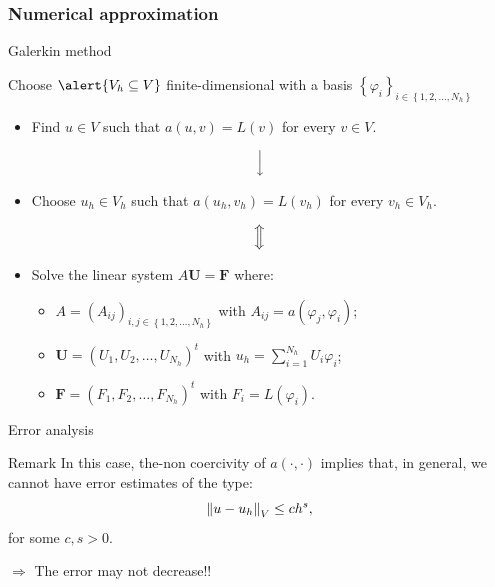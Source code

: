 \subsubsection{Numerical approximation}

\begin{frame}{Galerkin method}
	\begin{block}{}
	\begin{center}
	Choose $\alert{V_h\subseteq V}$ finite-dimensional with a basis $\left\{\varphi_i\right\}_{i\in\left\{1,2,\ldots,N_h \right\}}$
	\end{center}
	\end{block}
	
	\vspace*{-0.3cm}
	\begin{itemize}
	\item Find $u\in V$ such that $a(u,v)=L(v)$ for every $v\in V$.
	\end{itemize}
	\vspace*{0.1cm}
	$$\Big{\downarrow}$$
	\vspace*{-0.3cm}
	\begin{itemize}
	\item Choose $u_h\in V_h$ such that $a(u_h,v_h)=L(v_h)$ for every $v_h\in V_h$.
	\end{itemize}
	\vspace*{0.1cm}
	$$\Big{\Updownarrow}$$
	\vspace*{-0.3cm}
	\begin{itemize}
	\item Solve the linear system $A\mathbf{U}=\mathbf{F}$ where:
	\vspace*{0.3cm}
	\begin{itemize}
		\item $A=\left(A_{i j}\right)_{i, j\in\left\{1,2,\ldots,N_h\right\}}$ with $A_{i j}=a(\varphi_j,\varphi_i)$;
		\item $\mathbf{U}=\left(U_1,U_2,\ldots,U_{N_h}\right)^t$ with $u_h=\displaystyle\sum_{i=1}^{N_h}U_i\varphi_i$;
		\item $\mathbf{F}=\left(F_1,F_2,\ldots,F_{N_h}\right)^t$ with $F_i=L\left(\varphi_i\right)$.
	\end{itemize}
	\end{itemize}
\end{frame}

\begin{frame}{Error analysis}
	\begin{block}{Remark}
		In this case, the-non coercivity of $a(\cdot,\cdot)$ implies that, in general, we cannot have error estimates of the type:
		$$
		\left\|u-u_h\right\|_V\le c h^s,
		$$
		for some $c,s>0$.

		\vspace*{0.5cm}
		$\Longrightarrow$ \alert{The error may not decrease!!}
	\end{block}
\end{frame}

